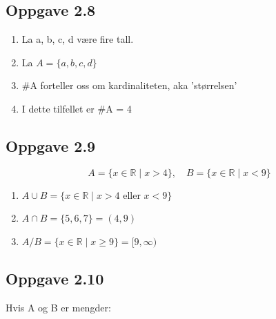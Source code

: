 \documentclass{article}
\begin{document}
\subsection*{Oppgave 2.8}

\begin{enumerate}[-]
    \item La a, b, c, d være fire tall.
    \item La \(A = \{a, b, c, d\}\) 
    \item \#A forteller oss om kardinaliteten, aka 'størrelsen' 
    \item I dette tilfellet er \#A = 4 
\end{enumerate}

\subsection*{Oppgave 2.9}
\[A = \{x \in \mathbb{R} \mid x > 4 \}, \quad B = \{x \in \mathbb{R} \mid x < 9 \}\]

\begin{enumerate}
    \item \(A \cup B = \{x \in \mathbb{R} \mid x > 4 \text{ eller } x < 9\}\)
    \item \(A \cap B = \{5, 6, 7\} = (4, 9)\)
    \item \(A / B = \{x \in \mathbb{R} \mid x \ge 9 \} = [9, \infty)\)
\end{enumerate}

\subsection*{Oppgave 2.10}
Hvis A og B er mengder:
\end{document}
